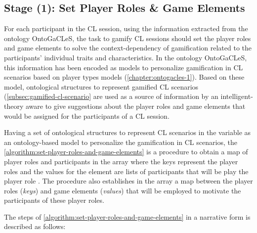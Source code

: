 \subsection{Stage (1): Set Player Roles \& Game Elements}

For each participant in the CL session, using the information extracted from the ontology OntoGaCLeS, the task to gamify CL sessions should set the player roles and game elements to solve the context-dependency of gamification related to the participants' individual traits and characteristics.
In the ontology OntoGaCLeS, this information has been encoded as models to personalize gamification in CL scenarios based on player types models (\autoref{chapter:ontogacles-1}).
Based on these model, ontological structures to represent gamified CL scenarios (\autoref{subsec:gamified-cl-scenario} are used as a source of information by an intelligent-theory aware to give suggestions about the player roles and game elements that would be assigned for the participants of a CL session.

Having a set of ontological structures to represent CL scenarios in the variable  as an ontology-based model to personalize the gamification in CL scenarios, the \autoref{algorithm:set-player-roles-and-game-elements} is a procedure to obtain a map of player roles and participants in the array  where the keys represent the player roles and the values for the element  are lists of participants that will be play the player role . The procedure also establishes in the array  a map between the player roles (\emph{keys}) and game elements (\emph{values}) that will be employed to motivate the participants of these player roles.

The steps of \autoref{algorithm:set-player-roles-and-game-elements} in a narrative form is described as follows:

